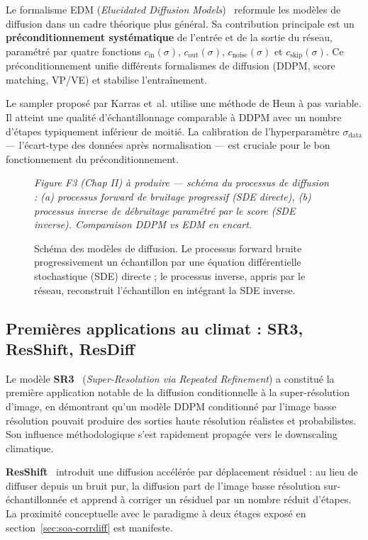 \documentclass[14pt,a4paper,openany]{extreport}
\theoremstyle{definition}
\newcommand{\figplaceholder}[2][0.9\linewidth]{%
  \begin{tcolorbox}[width=#1,height=5cm,valign=center,colback=gray!8,colframe=gray!45,arc=2pt,boxrule=0.5pt]
    \centering\small\textit{#2}
  \end{tcolorbox}%
}
\begin{document}
Le formalisme EDM (\emph{Elucidated Diffusion Models})~\cite{karras_edm_2022} reformule les modèles de diffusion dans un cadre théorique plus général. Sa contribution principale est un \textbf{préconditionnement systématique} de l'entrée et de la sortie du réseau, paramétré par quatre fonctions $c_{\mathrm{in}}(\sigma)$, $c_{\mathrm{out}}(\sigma)$, $c_{\mathrm{noise}}(\sigma)$ et $c_{\mathrm{skip}}(\sigma)$. Ce préconditionnement unifie différents formalismes de diffusion (DDPM, score matching, VP/VE) et stabilise l'entraînement.

Le sampler proposé par Karras et~al. utilise une méthode de Heun à pas variable. Il atteint une qualité d'échantillonnage comparable à DDPM avec un nombre d'étapes typiquement inférieur de moitié. La calibration de l'hyperparamètre $\sigma_{\mathrm{data}}$ --- l'écart-type des données après normalisation --- est cruciale pour le bon fonctionnement du préconditionnement.

\begin{figure}[ht]
  \centering
  \figplaceholder{Figure F3 (Chap II) à produire --- schéma du processus de diffusion : (a) processus forward de bruitage progressif (SDE directe), (b) processus inverse de débruitage paramétré par le score (SDE inverse). Comparaison DDPM vs EDM en encart.}
  \caption{Schéma des modèles de diffusion. Le processus forward bruite progressivement un échantillon par une équation différentielle stochastique (SDE) directe ; le processus inverse, appris par le réseau, reconstruit l'échantillon en intégrant la SDE inverse.}
  \label{fig:diffusion}
\end{figure}

\subsection{Premières applications au climat : SR3, ResShift, ResDiff}
\label{ssec:soa-sr3-resdiff}

Le modèle \textbf{SR3}~\cite{saharia_sr3_2022} (\emph{Super-Resolution via Repeated Refinement}) a constitué la première application notable de la diffusion conditionnelle à la super-résolution d'image, en démontrant qu'un modèle DDPM conditionné par l'image basse résolution pouvait produire des sorties haute résolution réalistes et probabilistes. Son influence méthodologique s'est rapidement propagée vers le downscaling climatique.

\textbf{ResShift}~\cite{yue_resshift_2023} introduit une diffusion accélérée par déplacement résiduel : au lieu de diffuser depuis un bruit pur, la diffusion part de l'image basse résolution sur-échantillonnée et apprend à corriger un résiduel par un nombre réduit d'étapes. La proximité conceptuelle avec le paradigme à deux étages exposé en section~\ref{sec:soa-corrdiff} est manifeste.
\end{document}
